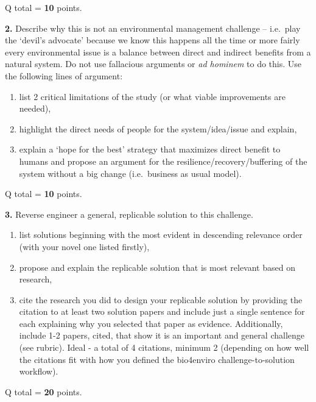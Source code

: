 \documentclass[
]{book}
\providecommand{\tightlist}{%
  \setlength{\itemsep}{0pt}\setlength{\parskip}{0pt}}
\begin{document}
Q total = \textbf{10} points.

\textbf{2.} Describe why this is not an environmental management challenge -- i.e.~play the `devil's advocate' because we know this happens all the time or more fairly every environmental issue is a balance between direct and indirect benefits from a natural system. Do not use fallacious arguments or \emph{ad hominem} to do this. Use the following lines of argument:

\begin{enumerate}
\def\labelenumi{(\alph{enumi})}
\tightlist
\item
  list 2 critical limitations of the study (or what viable improvements are needed),\\
\item
  highlight the direct needs of people for the system/idea/issue and explain,\\
\item
  explain a `hope for the best' strategy that maximizes direct benefit to humans and propose an argument for the resilience/recovery/buffering of the system without a big change (i.e.~business as usual model).
\end{enumerate}

Q total = \textbf{10} points.

\textbf{3.} Reverse engineer a general, replicable solution to this challenge.

\begin{enumerate}
\def\labelenumi{(\alph{enumi})}
\tightlist
\item
  list solutions beginning with the most evident in descending relevance order (with your novel one listed firstly),\\
\item
  propose and explain the replicable solution that is most relevant based on research,\\
\item
  cite the research you did to design your replicable solution by providing the citation to at least two solution papers and include just a single sentence for each explaining why you selected that paper as evidence. Additionally, include 1-2 papers, cited, that show it is an important and general challenge (see rubric). Ideal - a total of 4 citations, minimum 2 (depending on how well the citations fit with how you defined the bio4enviro challenge-to-solution workflow).
\end{enumerate}

Q total = \textbf{20} points.
\end{document}
